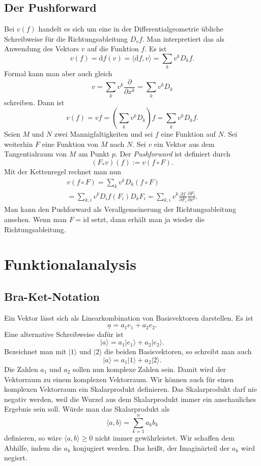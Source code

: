 \documentclass[a4paper,10pt,fleqn,twocolumn,twoside]{article}
\begin{document}
\subsection{Der Pushforward}

Bei \(v(f)\) handelt es sich um eine in der Differentialgeometrie
übliche Schreibweise für die Richtungsableitung \(D_v f\). Man
interpretiert das als Anwendung des Vektors \(v\) auf die Funktion
\(f\). Es ist
\[v(f) = \mathrm df(v) = \langle\mathrm df,v\rangle
= \sum_k v^k D_k f.\]
Formal kann man aber auch gleich
\[v=\sum_k v^k\frac{\partial}{\partial x^k} = \sum_k v^k D_k\]
schreiben. Dann ist
\[v(f) = vf = (\sum_k v^k D_k)f = \sum_k v^k D_k f.\]
%
Seien \(M\) und \(N\) zwei Mannigfaltigkeiten und sei \(f\) eine
Funktion auf \(N\). Sei weiterhin \(F\) eine Funktion von \(M\) nach
\(N\). Sei \(v\) ein Vektor aus dem Tangentialraum von \(M\) am Punkt
\(p\). Der \textit{Pushforward} ist definiert durch
\[(F_\ast v)(f) := v(f\circ F).\]
Mit der Kettenregel rechnet man nun
\begin{gather*}
v(f\circ F) = \sum_k v^k D_k(f\circ F)\\
= \sum_{k,i} v^k D_i f(F_i)D_k F_i
= \sum_{k,i} v^k \frac{\partial f}{\partial F_i}
\frac{\partial F_i}{\partial x^k}.
\end{gather*}
Man kann den Pushforward als Verallgemeinerung der Richtungsableitung
ansehen. Wenn man \(F=\mathrm{id}\) setzt, dann erhält man ja wieder
die Richtungsableitung.



\section{Funktionalanalysis}

\subsection{Bra-Ket-Notation}

Ein Vektor lässt sich als Linearkombination von Basisvektoren
darstellen. Es ist
\[\underline a = a_1e_1+a_2e_2.\]
Eine alternative Schreibweise dafür ist
\[|a\rangle = a_1|e_1\rangle+a_2|e_2\rangle.\]
Bezeichnet man mit \(|1\rangle\) und \(|2\rangle\) die beiden
Basisvektoren, so schreibt man auch
\[|a\rangle = a_1|1\rangle+a_2|2\rangle.\]
Die Zahlen \(a_1\) und \(a_2\) sollen nun komplexe Zahlen sein.
Damit wird der Vektorraum zu einem komplexen Vektorraum. Wir können
auch für einen komplexen Vektorraum ein Skalarprodukt definieren.
Das Skalarprodukt darf nie negativ werden, weil die Wurzel aus dem
Skalarprodukt immer ein anschauliches Ergebnis sein soll. Würde man
das Skalarprodukt als
\[\langle a,b\rangle = \sum_{k=1}^n a_kb_k\]
definieren, so wäre \(\langle a,b\rangle\geq 0\) nicht immer
gewährleistet. Wir schaffen dem Abhilfe, indem die \(a_k\) konjugiert
werden. Das heißt, der Imaginärteil der \(a_k\) wird negiert.
\end{document}
